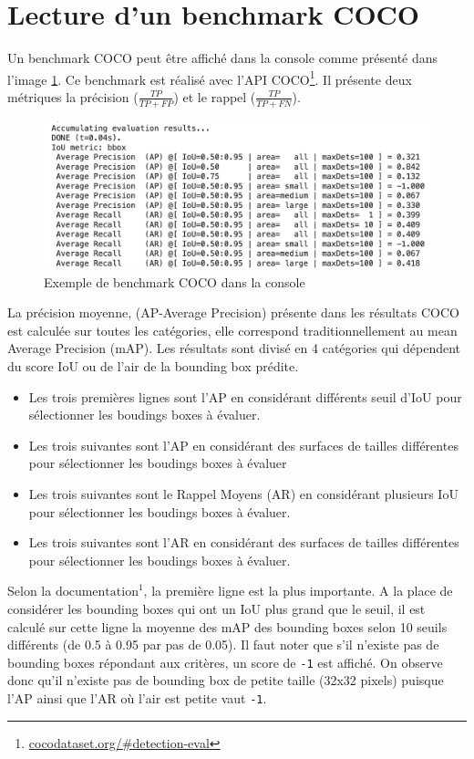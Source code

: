 \section{Lecture d'un benchmark COCO}
Un benchmark COCO peut être affiché dans la console comme présenté dans l'image \ref{fig:eval_coco_benchmark}. Ce benchmark est réalisé avec l'API COCO\footnote[1]{\url{cocodataset.org/\#detection-eval}}. Il présente deux métriques la précision ($\displaystyle{\frac{TP}{TP+FP} }$) et le rappel ($\displaystyle{ \frac{TP}{TP+FN}}$).
\begin{figure}[h!]
    \centering
    \includegraphics[width=\textwidth]{images/eval_coco_benchmark_white.png}
    \caption{Exemple de benchmark COCO dans la console}
    \label{fig:eval_coco_benchmark}
\end{figure}
La précision moyenne, (AP-Average Precision) présente dans les résultats COCO est calculée sur toutes les catégories, elle correspond traditionnellement au mean Average Precision (mAP).
Les résultats sont divisé en 4 catégories qui dépendent du score IoU ou de l'air de la bounding box prédite.
\begin{itemize}
    \item Les trois premières lignes sont l'AP en considérant différents seuil d'IoU pour sélectionner les boudings boxes à évaluer.
    \item Les trois suivantes sont l'AP en considérant des surfaces de tailles différentes pour sélectionner les boudings boxes à évaluer
    \item Les trois suivantes sont le Rappel Moyens (AR) en considérant plusieurs IoU pour sélectionner les boudings boxes à évaluer.
    \item Les trois suivantes sont l'AR en considérant des surfaces de tailles différentes pour sélectionner les boudings boxes à évaluer.
\end{itemize}
Selon la $\text{documentation}^1$, la première ligne est la plus importante. A la place de considérer les bounding boxes qui ont un IoU plus grand que le seuil, il est calculé sur cette ligne la moyenne des mAP des bounding boxes selon 10 seuils différents (de 0.5 à 0.95 par pas de 0.05).
Il faut noter que s'il n'existe pas de bounding boxes répondant aux critères, un score de \verb|-1| est affiché. On observe donc qu'il n'existe pas de bounding box de petite taille (32x32 pixels) puisque l'AP ainsi que l'AR où l'air est petite vaut \verb|-1|.
